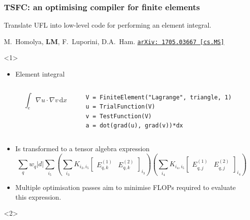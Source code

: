 \documentclass[presentation]{beamer}
\newcommand{\arxivlink}[2]{%
  \href{http://www.arxiv.org/abs/#1}%
  {\texttt{arXiv:\,#1\,[#2]}}%
}
\begin{document}
\begin{frame}[fragile]
  \frametitle{TSFC: an optimising compiler for finite elements}
  Translate UFL into low-level code for performing an element integral.
  \begin{flushright}
    {\scriptsize M.~Homolya, \textbf{LM}, F.~Luporini, D.A.~Ham. \arxivlink{1705.03667}{cs.MS}}
  \end{flushright}
  \begin{overlayarea}{\textwidth}{0.8\textheight}
  \begin{onlyenv}<1> 
    \begin{itemize}
    \item Element integral
      \begin{columns}
        \begin{column}{0.4\textwidth}
          \begin{equation*}
            \int_e \nabla u \cdot \nabla v\,\text{d}x
          \end{equation*}
        \end{column}
        \hspace{-3em}
        \begin{column}{0.6\textwidth}
\begin{verbatim}
V = FiniteElement("Lagrange", triangle, 1)
u = TrialFunction(V)
v = TestFunction(V)
a = dot(grad(u), grad(v))*dx
\end{verbatim}
        \end{column}
      \end{columns}
    \item Is transformed to a tensor algebra expression
      {\small \begin{equation*}
    \sum_q w_q \left| d \right| \sum_{i_5} \left( \sum_{i_3}
      K_{i_3,i_5} \begin{bmatrix}
        E^{(1)}_{q,k} & E^{(2)}_{q,k}
      \end{bmatrix}_{i_3} \right)
    \left( \sum_{i_4} K_{i_4,i_5} \begin{bmatrix}
        E^{(1)}_{q,j} & E^{(2)}_{q,j}
      \end{bmatrix}_{i_4} \right)
  \end{equation*}}
\item Multiple optimisation passes aim to minimise FLOPs required to
  evaluate this expression.
    \end{itemize}
  \end{onlyenv}
  \begin{onlyenv}<2>
    \begin{columns}

\end{columns}
\end{onlyenv}
\end{overlayarea}
\end{frame}
\end{document}
